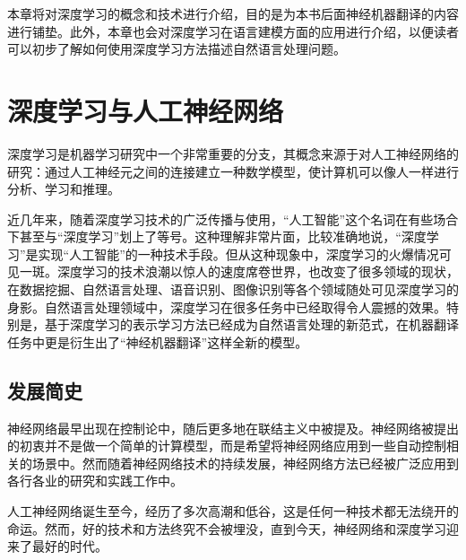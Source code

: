 \parinterval 本章将对深度学习的概念和技术进行介绍，目的是为本书后面神经机器翻译的内容进行铺垫。此外，本章也会对深度学习在语言建模方面的应用进行介绍，以便读者可以初步了解如何使用深度学习方法描述自然语言处理问题。


\section{深度学习与人工神经网络}

\parinterval 深度学习是机器学习研究中一个非常重要的分支，其概念来源于对人工神经网络的研究：通过人工神经元之间的连接建立一种数学模型，使计算机可以像人一样进行分析、学习和推理。

\parinterval 近几年来，随着深度学习技术的广泛传播与使用，“人工智能”这个名词在有些场合下甚至与“深度学习”划上了等号。这种理解非常片面，比较准确地说，“深度学习”是实现“人工智能”的一种技术手段。但从这种现象中，深度学习的火爆情况可见一斑。深度学习的技术浪潮以惊人的速度席卷世界，也改变了很多领域的现状，在数据挖掘、自然语言处理、语音识别、图像识别等各个领域随处可见深度学习的身影。自然语言处理领域中，深度学习在很多任务中已经取得令人震撼的效果。特别是，基于深度学习的表示学习方法已经成为自然语言处理的新范式，在机器翻译任务中更是衍生出了“神经机器翻译”这样全新的模型。


\subsection{发展简史}

\parinterval 神经网络最早出现在控制论中，随后更多地在联结主义中被提及。神经网络被提出的初衷并不是做一个简单的计算模型，而是希望将神经网络应用到一些自动控制相关的场景中。然而随着神经网络技术的持续发展，神经网络方法已经被广泛应用到各行各业的研究和实践工作中。

\parinterval 人工神经网络诞生至今，经历了多次高潮和低谷，这是任何一种技术都无法绕开的命运。然而，好的技术和方法终究不会被埋没，直到今天，神经网络和深度学习迎来了最好的时代。


